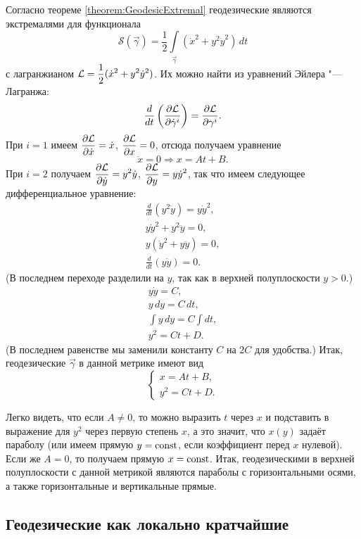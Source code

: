\begin{solution}
	Согласно теореме \ref{theorem:GeodesicExtremal} геодезические являются экстремалями для функционала
	\[
		\mathcal{S}(\vec{\gamma}) = \frac{1}{2}\int\limits_{\vec{\gamma}}(\dot{x}^2 + y^2\dot{y}^2)\,dt
	\]
	с лагранжианом $\displaystyle\mathcal{L} = \frac{1}{2}(\dot{x}^2 + y^2\dot{y}^2)$. Их можно найти из уравнений Эйлера "---Лагранжа:
	\[
		\frac{d}{dt}\left(\frac{\partial\mathcal{L}}{\partial \dot{\gamma}^i}\right) = \frac{\partial\mathcal{L}}{\partial\gamma^i}.
	\]
	При $i = 1$ имеем $\displaystyle\frac{\partial\mathcal{L}}{\partial\dot{x}} = \dot{x}$, $\displaystyle\frac{\partial\mathcal{L}}{\partial x} = 0$, отсюда получаем уравнение
	\[
		\ddot{x} = 0 \Rightarrow x = At + B.
	\]
	При $i = 2$ получаем $\displaystyle\frac{\partial\mathcal{L}}{\partial\dot{y}} = y^2\dot{y}$, $\displaystyle\frac{\partial\mathcal{L}}{\partial y} = y\dot{y}^2$, так что имеем следующее дифференциальное уравнение:
	\begin{gather*}
		\frac{d}{dt}(y^2\dot{y}) = y\dot{y}^2,\\
		y\dot{y}^2 + y^2\ddot{y} = 0,\\
		y(\dot{y}^2 + y\ddot{y}) = 0,\\
		\frac{d}{dt}(y\dot{y}) = 0.
	\end{gather*}
	(В последнем переходе разделили на $y$, так как в верхней полуплоскости $y > 0$.)
	\begin{gather*}
		y\dot{y} = C,\\
		y\,dy = C\,dt,\\
		\int y\,dy = C\int dt,\\
		y^2 = Ct + D.
	\end{gather*}
	(В последнем равенстве мы заменили константу $C$ на $2C$ для удобства.) Итак, геодезические $\vec{\gamma}$ в данной метрике имеют вид
	\[
		\begin{cases}
			x = At + B,\\
			y^2 = Ct + D.
		\end{cases}
	\]

	Легко видеть, что если $A \ne 0$, то можно выразить $t$ через $x$ и подставить в выражение для $y^2$ через первую степень $x$, а это значит, что $x(y)$ задаёт параболу (или имеем прямую $y = \mathrm{const}$, если коэффициент перед $x$ нулевой). Если же $A = 0$, то получаем прямую $x = \mathrm{const}$. Итак, геодезическими в верхней полуплоскости с данной метрикой являются параболы с горизонтальными осями, а также горизонтальные и вертикальные прямые.
\end{solution}

\subsection{Геодезические как локально кратчайшие}

